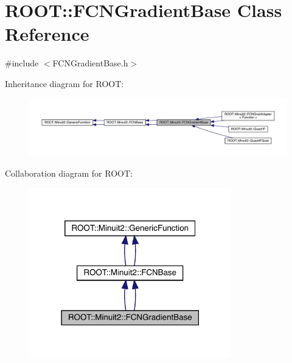 \hypertarget{classROOT_1_1Minuit2_1_1FCNGradientBase}{}\section{R\+O\+OT\+:\+:F\+C\+N\+Gradient\+Base Class Reference}
\label{classROOT_1_1Minuit2_1_1FCNGradientBase}


{\ttfamily \#include $<$F\+C\+N\+Gradient\+Base.\+h$>$}



Inheritance diagram for R\+O\+OT\+:\nopagebreak
\begin{figure}[H]
\begin{center}
\leavevmode
\includegraphics[width=350pt]{d8/d5e/classROOT_1_1Minuit2_1_1FCNGradientBase__inherit__graph}
\end{center}
\end{figure}


Collaboration diagram for R\+O\+OT\+:\nopagebreak
\begin{figure}[H]
\begin{center}
\leavevmode
\includegraphics[width=249pt]{d5/d8c/classROOT_1_1Minuit2_1_1FCNGradientBase__coll__graph}
\end{center}
\end{figure}
